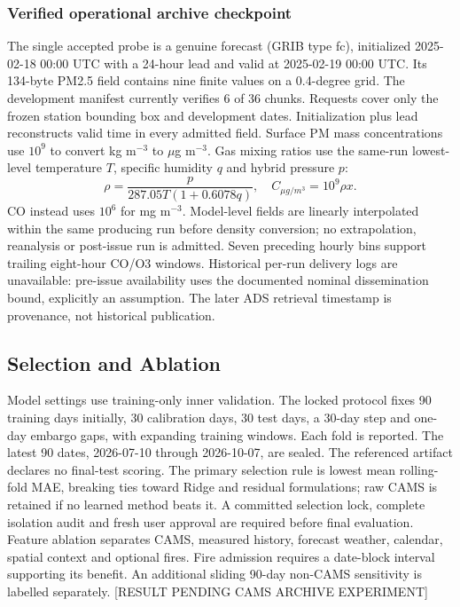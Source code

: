 \subsubsection{Verified operational archive checkpoint}
The single accepted probe is a genuine forecast (GRIB type fc), initialized
2025-02-18 00:00 UTC with a 24-hour lead and valid at 2025-02-19 00:00 UTC.
Its 134-byte PM2.5 field contains nine finite values on a 0.4-degree grid.
The development manifest currently verifies 6 of 36 chunks.
Requests cover only the frozen station bounding box and development dates.
Initialization plus lead reconstructs valid time in every admitted field.
Surface PM mass concentrations use $10^9$ to convert kg m$^{-3}$ to
$\mu$g m$^{-3}$. Gas mixing ratios use the same-run lowest-level
temperature $T$, specific humidity $q$ and hybrid pressure $p$:
\begin{equation}
\rho=\frac{p}{287.05T(1+0.6078q)},\quad C_{\mu g/m^3}=10^9\rho x.
\end{equation}
CO instead uses $10^6$ for mg m$^{-3}$. Model-level fields are linearly
interpolated within the same producing run before density conversion;
no extrapolation, reanalysis or post-issue run is admitted. Seven preceding
hourly bins support trailing eight-hour CO/O3 windows.
Historical per-run delivery logs are unavailable: pre-issue availability
uses the documented nominal dissemination bound, explicitly an assumption.
The later ADS retrieval timestamp is provenance, not historical publication.


\subsection{Selection and Ablation}
Model settings use training-only inner validation. The locked protocol fixes
90 training days initially, 30 calibration days, 30 test days, a 30-day step and
one-day embargo gaps, with expanding training windows. Each fold is reported.
The latest 90 dates, 2026-07-10 through 2026-10-07, are sealed.
The referenced artifact declares no final-test scoring. The primary selection rule is lowest mean rolling-fold MAE, breaking ties toward Ridge and residual formulations; raw CAMS is retained if no learned method beats it. A committed selection lock, complete isolation audit and fresh user approval are required before final evaluation. Feature ablation separates CAMS, measured history,
forecast weather, calendar, spatial context and optional fires. Fire admission
requires a date-block interval supporting its benefit. An additional sliding
90-day non-CAMS sensitivity is labelled separately.
[RESULT PENDING CAMS ARCHIVE EXPERIMENT]


